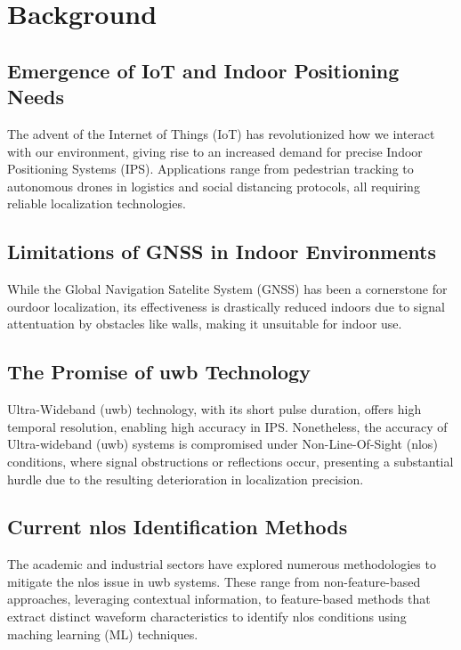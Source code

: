 \section{Background}\label{background}

\subsection{Emergence of IoT and Indoor Positioning Needs}\label{Emergence of IoT and Indoor Positioning Needs}
The advent of the Internet of Things (IoT) has revolutionized how we interact with our environment, giving rise to an increased demand for precise Indoor Positioning Systems (IPS). Applications range from pedestrian tracking to autonomous drones in logistics and social distancing protocols, all requiring reliable localization technologies.

\subsection{Limitations of GNSS in Indoor Environments}\label{Limitations of GNSS in Indoor Environments}
While the Global Navigation Satelite System (GNSS) has been a cornerstone for ourdoor localization, its effectiveness is drastically reduced indoors due to signal attentuation by obstacles like walls, making it unsuitable for indoor use.

\subsection{The Promise of \acrshort{uwb} Technology}\label{The Promise of UWB Technology}
Ultra-Wideband (\acrshort{uwb}) technology, with its short pulse duration, offers high temporal resolution, enabling high accuracy in IPS. Nonetheless, the accuracy of Ultra-wideband (\acrshort{uwb}) systems is compromised under Non-Line-Of-Sight (\acrshort{nlos}) conditions, where signal obstructions or reflections occur, presenting a substantial hurdle due to the resulting deterioration in localization precision.

\subsection{Current \acrshort{nlos} Identification Methods}\label{Current NLOS Identification Methods}
The academic and industrial sectors have explored numerous methodologies to mitigate the \acrshort{nlos} issue in \acrshort{uwb} systems. These range from non-feature-based approaches, leveraging contextual information, to feature-based methods that extract distinct waveform characteristics to identify \acrshort{nlos} conditions using maching learning (ML) techniques.

